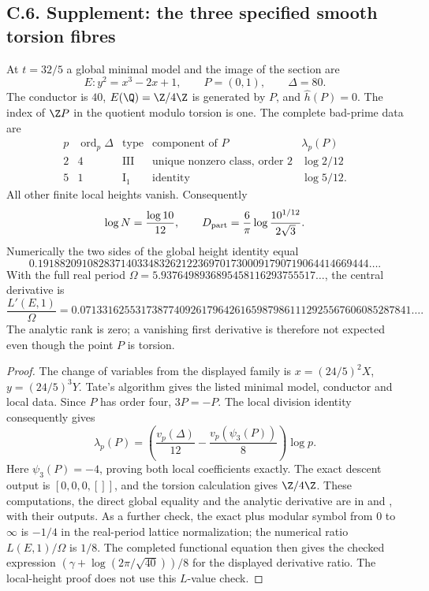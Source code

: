 \subsection{C.6. Supplement: the three specified smooth torsion fibres}

\begin{proposition}\label{ari:C.6.T1}
At $t=32/5$ a global minimal model and the image of the section are
\[
 E:y^2=x^3-2x+1,\qquad P=(0,1),\qquad \Delta=80.
\]
The conductor is $40$, $E(\Q)=\Z/4\Z$ is generated by $P$,
and $\widehat h(P)=0$. The index of $\Z P$ in the quotient
modulo torsion is one. The complete bad-prime data are
\[
\begin{array}{c|c|c|c|c}
p&\operatorname{ord}_p\Delta&\text{type}&\text{component of }P&\lambda_p(P)\\\hline
2&4&\mathrm{III}&\text{unique nonzero class, order }2&\log2/12\\
5&1&\mathrm I_1&\text{identity}&\log5/12.
\end{array}
\]
All other finite local heights vanish. Consequently
\[
 \log N=\frac{\log10}{12},\qquad
 D_{\rm part}=\frac6\pi\log\frac{10^{1/12}}{2\sqrt3}.
\]
Numerically the two sides of the global height identity equal
\[
 0.191882091082837140334832621223697017300091790719064414669444\ldots.
\]
With the full real period $\Omega=5.9376498936895458116293755517\ldots$,
the central derivative is
\[
 \frac{L'(E,1)}\Omega=
 0.071331625531738774092617964261659879861112925567606085287841\ldots.
\]
The analytic rank is zero; a vanishing first derivative is therefore
not expected even though the point $P$ is torsion.
\end{proposition}
\begin{proof}
The change of variables from the displayed family is
$x=(24/5)^2X$, $y=(24/5)^3Y$. Tate's algorithm gives the
listed minimal model, conductor and local data. Since $P$ has
order four, $3P=-P$. The local division identity consequently
gives
\[
 \lambda_p(P)=\left(\frac{v_p(\Delta)}{12}
                         -\frac{v_p(\psi_3(P))}{8}\right)\log p.
\]
Here $\psi_3(P)=-4$, proving both local coefficients exactly.
The exact descent output is $[0,0,0,[]]$, and the torsion
calculation gives $\Z/4\Z$. These computations, the direct
global equality and the analytic derivative are in
 and
, with their outputs.
As a further check, the exact plus modular symbol from $0$ to
$\infty$ is $-1/4$ in the real-period lattice normalization;
the numerical ratio $L(E,1)/\Omega$ is $1/8$. The completed
functional equation then gives the checked expression
$(\gamma+\log(2\pi/\sqrt{40}))/8$ for the displayed derivative
ratio. The local-height proof does not use this $L$-value check.
\end{proof}

